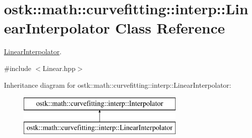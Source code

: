 \hypertarget{classostk_1_1math_1_1curvefitting_1_1interp_1_1_linear_interpolator}{}\section{ostk\+:\+:math\+:\+:curvefitting\+:\+:interp\+:\+:Linear\+Interpolator Class Reference}
\label{classostk_1_1math_1_1curvefitting_1_1interp_1_1_linear_interpolator}


\hyperlink{classostk_1_1math_1_1curvefitting_1_1interp_1_1_linear_interpolator}{Linear\+Interpolator}.  




{\ttfamily \#include $<$Linear.\+hpp$>$}

Inheritance diagram for ostk\+:\+:math\+:\+:curvefitting\+:\+:interp\+:\+:Linear\+Interpolator\+:\begin{figure}[H]
\begin{center}
\leavevmode
\includegraphics[height=2.000000cm]{classostk_1_1math_1_1curvefitting_1_1interp_1_1_linear_interpolator}
\end{center}
\end{figure}
